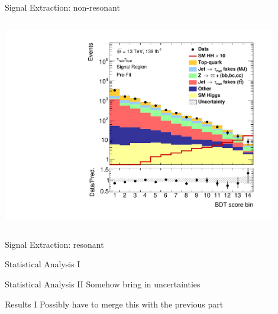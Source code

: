 \documentclass[11pt, xcolor={dvipsnames}, aspectratio=169]{beamer}
\begin{document}
\begin{frame}{Signal Extraction: non-resonant}
  \begin{columns}

    \centering
    \includegraphics[width=0.9\textwidth]{mva/prefit/Region_BMin0_incJet1_distSMBDT_J2_Y2015_DLLOS_T2_SpcTauHH_L0_Prefitlog}
  \end{columns}
\end{frame}


\begin{frame}{Signal Extraction: resonant}
\end{frame}


\begin{frame}{Statistical Analysis I}
\end{frame}


\begin{frame}{Statistical Analysis II}
  Somehow bring in uncertainties
\end{frame}


\begin{frame}{Results I}
  Possibly have to merge this with the previous part
\end{frame}

\end{document}
